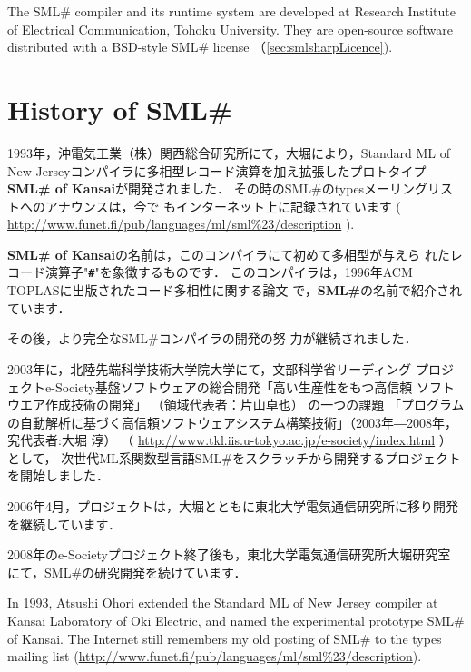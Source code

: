 \documentclass{jbook}
\newcommand{\txt}[2]{#2}
\newcommand{\smlsharp}{SML\#}
\newcommand{\code}[1]{\mbox{{\tt #1}}}
\begin{document}
	The \smlsharp{} compiler and its runtime system are developed at
Research Institute of Electrical Communication,  Tohoku University.
	They are open-source software distributed with a BSD-style
\smlsharp{} license （\ref{sec:smlsharpLicence}).
\fi%

\section{\txt{\smlsharp{}の歴史}{History of \smlsharp{}}}
\label{sec:smlsharpHistory}

\ifx\jp%
	1993年，沖電気工業（株）関西総合研究所にて，大堀により，Standard
ML of New Jerseyコンパイラに多相型レコード演算を加え拡張したプロトタイプ
{\bf SML\# of Kansai}が開発されました．
	その時の\smlsharp{}のtypesメーリングリストへのアナウンスは，今で
もインターネット上に記録されています
(
\url{http://www.funet.fi/pub/languages/ml/sml%23/description}
).

	{\bf SML\# of Kansai}の名前は，このコンパイラにて初めて多相型が与えら
れたレコード演算子"{\bf \code{\#}}"を象徴するものです．
	このコンパイラは，1996年ACM TOPLASに出版されたコード多相性に関する論文
\cite{ohor95toplas}で，{\bf \smlsharp{}}の名前で紹介されています．

	その後，より完全な\smlsharp{}コンパイラの開発の努
力が継続されました．

	2003年に，北陸先端科学技術大学院大学にて，文部科学省リーディング
プロジェクトe-Society基盤ソフトウェアの総合開発「高い生産性をもつ高信頼
ソフトウエア作成技術の開発」
（領域代表者：片山卓也）
の一つの課題
「プログラムの自動解析に基づく高信頼ソフトウェアシステム構築技術」（2003年―2008年，究代表者:大堀 淳）
（
\url{http://www.tkl.iis.u-tokyo.ac.jp/e-society/index.html}
）
として，
次世代ML系関数型言語\smlsharp{}をスクラッチから開発するプロジェクトを開始しました．

2006年4月，プロジェクトは，大堀とともに東北大学電気通信研究所に移り開発
を継続しています．

2008年のe-Societyプロジェクト終了後も，東北大学電気通信研究所大堀研究室
にて，\smlsharp{}の研究開発を続けています．

\else%

	In 1993, Atsushi Ohori extended the Standard ML of New Jersey
compiler at Kansai Laboratory of Oki Electric, and named the
experimental prototype SML\# of Kansai. 
	The Internet still remembers my old posting of \smlsharp{} to
the types mailing list 
(\url{http://www.funet.fi/pub/languages/ml/sml%23/description}).
\end{document}
